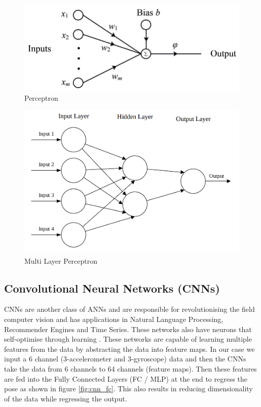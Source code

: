 \begin{figure}[H]
    \centering
    \includegraphics[scale=0.5]{images/fig_chapter2/nns/perceptron.png}
    \caption{Perceptron}
    \label{fig:perceptron}
\end{figure}

\begin{figure}[H]
    \centering
    \includegraphics[scale=0.3]{images/fig_chapter2/nns/mlp.png}
    \caption{Multi Layer Perceptron}
    \label{fig:mlp}
\end{figure}

\subsection{Convolutional Neural Networks (CNNs)}
CNNs are another class of ANNs and are responsible for revolutionising the field computer vision and has applications in Natural Language Processing, Recommender Engines and Time Series. These networks also have neurons that self-optimise through learning \citep{cnn2015introduction}. These networks are capable of learning multiple features from the data by abstracting the data into feature maps. In our case we input a 6 channel (3-accelerometer and 3-gyroscope) data and then the CNNs take the data from 6 channels to 64 channels (feature maps). Then these features are fed into the Fully Connected Layers (FC / MLP) at the end to regress the pose as shown in figure \ref{fig:cnn_fc}. This also results in reducing dimensionality of the data while regressing the output. 

